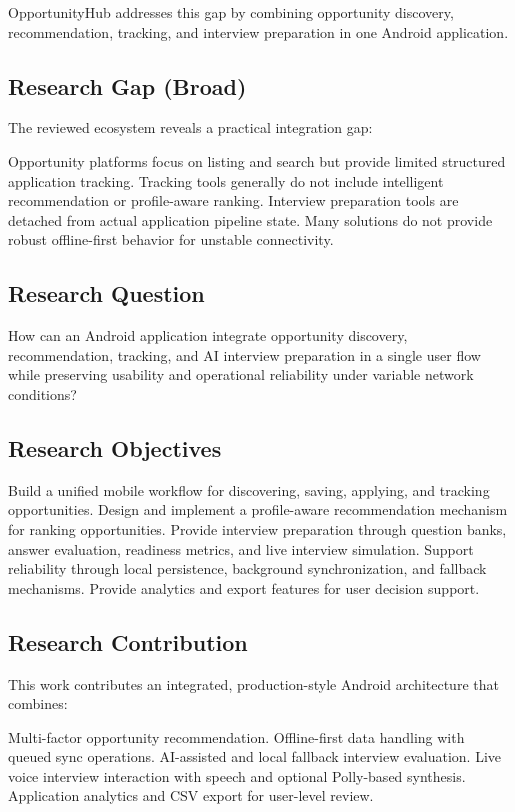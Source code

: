 \documentclass[conference]{IEEEtran}
\begin{document}
OpportunityHub addresses this gap by combining opportunity discovery, recommendation, tracking, and interview preparation in one Android application.

\subsection{Research Gap (Broad)}

The reviewed ecosystem reveals a practical integration gap:

Opportunity platforms focus on listing and search but provide limited structured application tracking. Tracking tools generally do not include intelligent recommendation or profile-aware ranking. Interview preparation tools are detached from actual application pipeline state. Many solutions do not provide robust offline-first behavior for unstable connectivity.

\subsection{Research Question}

How can an Android application integrate opportunity discovery, recommendation, tracking, and AI interview preparation in a single user flow while preserving usability and operational reliability under variable network conditions?

\subsection{Research Objectives}

Build a unified mobile workflow for discovering, saving, applying, and tracking opportunities. Design and implement a profile-aware recommendation mechanism for ranking opportunities. Provide interview preparation through question banks, answer evaluation, readiness metrics, and live interview simulation. Support reliability through local persistence, background synchronization, and fallback mechanisms. Provide analytics and export features for user decision support.

\subsection{Research Contribution}

This work contributes an integrated, production-style Android architecture that combines:

Multi-factor opportunity recommendation. Offline-first data handling with queued sync operations. AI-assisted and local fallback interview evaluation. Live voice interview interaction with speech and optional Polly-based synthesis. Application analytics and CSV export for user-level review.
\end{document}
